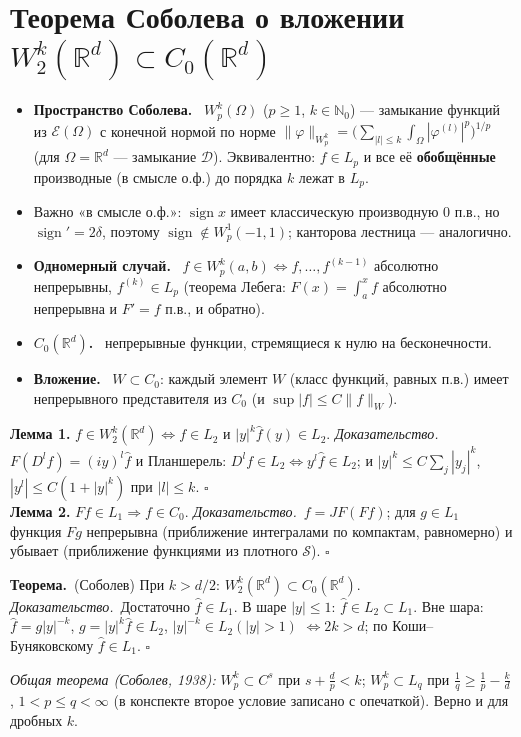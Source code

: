 \documentclass[11pt,a4paper]{article}
\newcommand{\RR}{\mathbb R}
\newcommand{\NN}{\mathbb N}
\newcommand{\DD}{\mathcal D}
\newcommand{\EE}{\mathcal E}
\newcommand{\Sc}{\mathcal S}
\newcommand{\df}[1]{\textbf{#1.}~}
\newcommand{\thm}{\textbf{Теорема.}~}
\newcommand{\pf}{\textit{Доказательство.}~}
\newcommand{\qedd}{\hfill$\square$}
\begin{document}
\section{Теорема Соболева о вложении $W_2^k(\RR^d)\subset C_0(\RR^d)$}
\begin{defs}
\begin{itemize}
\item \df{Пространство Соболева} $W_p^k(\Omega)$ ($p\ge1$, $k\in\NN_0$) — замыкание функций из $\EE(\Omega)$ с конечной нормой по норме $\|\varphi\|_{W_p^k}=\bigl(\sum_{|l|\le k}\int_\Omega|\varphi^{(l)}|^p\bigr)^{1/p}$ (для $\Omega=\RR^d$ — замыкание $\DD$). Эквивалентно: $f\in L_p$ и все её \textbf{обобщённые} производные (в смысле о.ф.) до порядка $k$ лежат в $L_p$.
\item Важно «в смысле о.ф.»: $\operatorname{sign}x$ имеет классическую производную $0$ п.в., но $\operatorname{sign}'=2\delta$, поэтому $\operatorname{sign}\notin W_p^1(-1,1)$; канторова лестница — аналогично.
\item \df{Одномерный случай} $f\in W_p^k(a,b)\iff f,\dots,f^{(k-1)}$ абсолютно непрерывны, $f^{(k)}\in L_p$ (теорема Лебега: $F(x)=\int_a^xf$ абсолютно непрерывна и $F'=f$ п.в., и обратно).
\item \df{$C_0(\RR^d)$} непрерывные функции, стремящиеся к нулю на бесконечности.
\item \df{Вложение} $W\subset C_0$: каждый элемент $W$ (класс функций, равных п.в.) имеет непрерывного представителя из $C_0$ (и $\sup|f|\le C\|f\|_W$).
\end{itemize}
\end{defs}

\textbf{Лемма 1.} $f\in W_2^k(\RR^d)\iff f\in L_2$ и $|y|^k\hat f(y)\in L_2$. \pf $F(D^lf)=(iy)^l\hat f$ и Планшерель: $D^lf\in L_2\iff y^l\hat f\in L_2$; и $|y|^k\le C\sum_j|y_j|^k$, $|y^l|\le C(1+|y|^k)$ при $|l|\le k$. \qedd\\
\textbf{Лемма 2.} $Ff\in L_1\Rightarrow f\in C_0$. \pf $f=JF(Ff)$; для $g\in L_1$ функция $Fg$ непрерывна (приближение интегралами по компактам, равномерно) и убывает (приближение функциями из плотного $\Sc$). \qedd

\thm (Соболев) При $k>d/2$: $W_2^k(\RR^d)\subset C_0(\RR^d)$.\\
\pf Достаточно $\hat f\in L_1$. В шаре $|y|\le1$: $\hat f\in L_2\subset L_1$. Вне шара: $\hat f=g|y|^{-k}$, $g=|y|^k\hat f\in L_2$, $|y|^{-k}\in L_2(|y|>1)$ $\iff2k>d$; по Коши–Буняковскому $\hat f\in L_1$. \qedd

\textit{Общая теорема (Соболев, 1938):} $W_p^k\subset C^s$ при $s+\frac dp<k$; $W_p^k\subset L_q$ при $\frac1q\ge\frac1p-\frac kd$, $1<p\le q<\infty$ (в конспекте второе условие записано с опечаткой). Верно и для дробных $k$.
\end{document}

